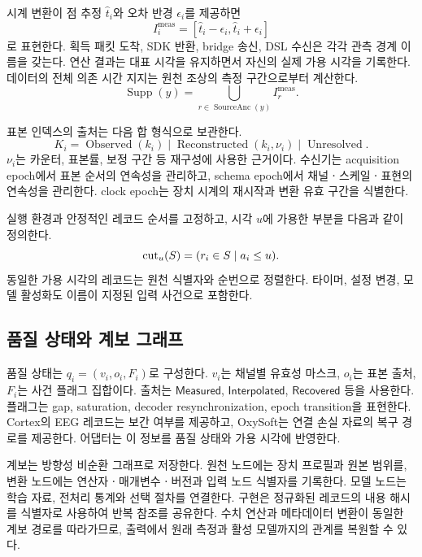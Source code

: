 시계 변환이 점 추정 $\widehat t_i$와 오차 반경 $\epsilon_i$를 제공하면
\begin{equation}
 I_i^{\mathrm{meas}}=[\widehat t_i-\epsilon_i,\widehat t_i+\epsilon_i]
\end{equation}
로 표현한다. 획득 패킷 도착, SDK 반환, bridge 송신, DSL 수신은 각각 관측 경계 이름을 갖는다.
연산 결과는 대표 시각을 유지하면서 자신의 실제 가용 시각을 기록한다.
데이터의 전체 의존 시간 지지는 원천 조상의 측정 구간으로부터 계산한다.
\begin{equation}
 \operatorname{Supp}(y)=
 \bigcup_{r\in\operatorname{SourceAnc}(y)}I_r^{\mathrm{meas}}.
 \label{eq:support}
\end{equation}

표본 인덱스의 출처는 다음 합 형식으로 보관한다.
\begin{equation}
 K_i=\operatorname{Observed}(k_i)
 \mid\operatorname{Reconstructed}(k_i,\nu_i)
 \mid\operatorname{Unresolved}.
\end{equation}
$\nu_i$는 카운터, 표본률, 보정 구간 등 재구성에 사용한 근거이다.
수신기는 acquisition epoch에서 표본 순서의 연속성을 관리하고,
schema epoch에서 채널ㆍ스케일ㆍ표현의 연속성을 관리한다.
clock epoch는 장치 시계의 재시작과 변환 유효 구간을 식별한다.

\begin{definition}[가용 접두 스트림]
실행 환경과 안정적인 레코드 순서를 고정하고, 시각 $u$에 가용한 부분을 다음과 같이 정의한다.
\begin{equation}
 \operatorname{cut}_u(S)=(r_i\in S\mid a_i\le u).
 \label{eq:cut}
\end{equation}
동일한 가용 시각의 레코드는 원천 식별자와 순번으로 정렬한다.
타이머, 설정 변경, 모델 활성화도 이름이 지정된 입력 사건으로 포함한다.
\end{definition}

\subsection{품질 상태와 계보 그래프}
품질 상태는 $q_i=(v_i,o_i,F_i)$로 구성한다. $v_i$는 채널별 유효성 마스크,
$o_i$는 표본 출처, $F_i$는 사건 플래그 집합이다. 출처는
$\mathsf{Measured}$, $\mathsf{Interpolated}$, $\mathsf{Recovered}$ 등을 사용한다.
플래그는 gap, saturation, decoder resynchronization, epoch transition을 표현한다.
Cortex의 EEG 레코드는 보간 여부를 제공하고\cite{cortex_sample}, OxySoft는
연결 손실 자료의 복구 경로를 제공한다\cite{oxysoft}. 어댑터는 이 정보를
품질 상태와 가용 시각에 반영한다.

계보는 방향성 비순환 그래프로 저장한다. 원천 노드에는 장치 프로필과 원본 범위를,
변환 노드에는 연산자ㆍ매개변수ㆍ버전과 입력 노드 식별자를 기록한다.
모델 노드는 학습 자료, 전처리 통계와 선택 절차를 연결한다.
구현은 정규화된 레코드의 내용 해시를 식별자로 사용하여 반복 참조를 공유한다.
수치 연산과 메타데이터 변환이 동일한 계보 경로를 따라가므로,
출력에서 원래 측정과 활성 모델까지의 관계를 복원할 수 있다.
